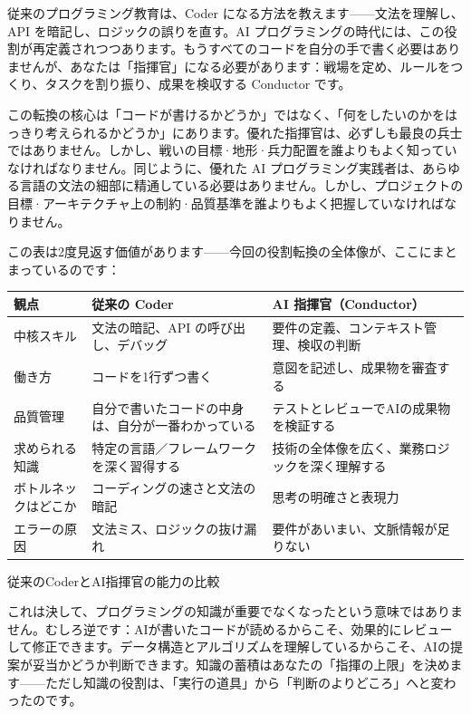 
従来のプログラミング教育は、Coder になる方法を教えます——文法を理解し、API を暗記し、ロジックの誤りを直す。AI プログラミングの時代には、この役割が再定義されつつあります。もうすべてのコードを自分の手で書く必要はありませんが、あなたは「指揮官」になる必要があります：戦場を定め、ルールをつくり、タスクを割り振り、成果を検収する Conductor です。

この転換の核心は「コードが書けるかどうか」ではなく、「何をしたいのかをはっきり考えられるかどうか」にあります。優れた指揮官は、必ずしも最良の兵士ではありません。しかし、戦いの目標·地形·兵力配置を誰よりもよく知っていなければなりません。同じように、優れた AI プログラミング実践者は、あらゆる言語の文法の細部に精通している必要はありません。しかし、プロジェクトの目標·アーキテクチャ上の制約·品質基準を誰よりもよく把握していなければなりません。

この表は2度見返す価値があります——今回の役割転換の全体像が、ここにまとまっているのです：

\begin{center}
\begin{tabularx}{\linewidth}{|X|X|X|}
\hline
\textbf{観点} & \textbf{従来の Coder} & \textbf{AI 指揮官（Conductor）} \tabularnewline
\hline
中核スキル & 文法の暗記、API の呼び出し、デバッグ & 要件の定義、コンテキスト管理、検収の判断 \tabularnewline
働き方 & コードを1行ずつ書く & 意図を記述し、成果物を審査する \tabularnewline
品質管理 & 自分で書いたコードの中身は、自分が一番わかっている & テストとレビューでAIの成果物を検証する \tabularnewline
求められる知識 & 特定の言語／フレームワークを深く習得する & 技術の全体像を広く、業務ロジックを深く理解する \tabularnewline
ボトルネックはどこか & コーディングの速さと文法の暗記 & 思考の明確さと表現力 \tabularnewline
エラーの原因 & 文法ミス、ロジックの抜け漏れ & 要件があいまい、文脈情報が足りない \tabularnewline
\hline
\end{tabularx}
\end{center}

\begin{center}\small\color{gray}従来のCoderとAI指揮官の能力の比較\end{center}

これは決して、プログラミングの知識が重要でなくなったという意味ではありません。むしろ逆です：AIが書いたコードが読めるからこそ、効果的にレビューして修正できます。データ構造とアルゴリズムを理解しているからこそ、AIの提案が妥当かどうか判断できます。知識の蓄積はあなたの「指揮の上限」を決めます——ただし知識の役割は、「実行の道具」から「判断のよりどころ」へと変わったのです。

